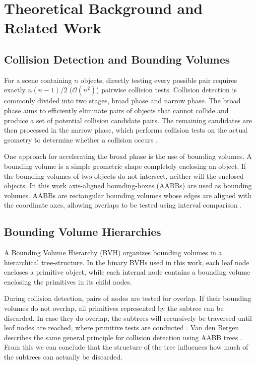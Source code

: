 \chapter{Theoretical Background and Related Work}

\section{Collision Detection and Bounding Volumes}

For a scene containing $n$ objects, directly testing every possible pair requires exactly $n(n-1)/2$ ($\mathcal{O}(n^2)$) pairwise collision tests.
Collision detection is commonly divided into two stages, broad phase and narrow phase.
The broad phase aims to efficiently eliminate pairs of objects that cannot collide and produce a set of potential collision candidate pairs.
The remaining candidates are then processed in the narrow phase, which performs collision tests on the actual geometry to determine whether a collision occurs  \cite[p.~14]{ericson2004real}.

One approach for accelerating the broad phase is the use of bounding volumes.
A bounding volume is a simple geometric shape completely enclosing an object.
If the bounding volumes of two objects do not intersect, neither will the enclosed objects.
In this work axis-aligned bounding-boxes (AABBs) are used as bounding volumes.
AABBs are rectangular bounding volumes whose edges are aligned with the coordinate axes, allowing overlaps to be tested using interval comparison \cite[pp.~75--81]{ericson2004real} \cite[p.~1]{vandenbergen1997aabb}.

\section{Bounding Volume Hierarchies}

A Bounding Volume Hierarchy (BVH) organizes bounding volumes in a hierarchical tree-structure. 
In the binary BVHs used in this work, each leaf node encloses a primitive object, while each internal node contains a bounding volume enclosing the primitives in its child nodes. \cite[pp.~235--238]{ericson2004real}

During collision detection, pairs of nodes are tested for overlap.
If their bounding volumes do not overlap, all primitives represented by the subtree can be discarded.
In case they do overlap, the subtrees will recursively be traversed until leaf nodes are reached, where primitive tests are conducted \cite[pp.~253--260]{ericson2004real}. 
Van den Bergen describes the same general principle for collision detection using AABB trees \cite[p.~4]{vandenbergen1997aabb}.
From this we can conclude that the structure of the tree influences how much of the subtrees can actually be discarded. 

